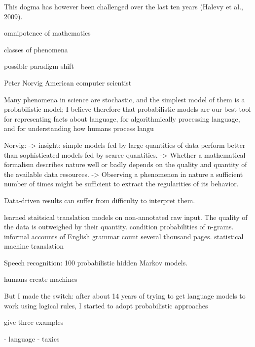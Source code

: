 \documentclass[authoryear,review,3p]{elsarticle}
\begin{document}
This dogma has however been challenged over the last ten years
(Halevy et al., 2009).

omnipotence of mathematics



classes of phenomena

possible paradigm shift

Peter Norvig 
American computer scientist


Many phenomena in science are stochastic, and the simplest model of them is a probabilistic model; I believe therefore that probabilistic models are our best tool for representing facts about language, for algorithmically processing language, and for understanding how humans process langu


Norvig:
-> insight: simple models fed by large quantities of data perform
better than sophisticated models fed by scarce quantities.
-> Whether a mathematical formalism describes nature well or badly
depends on the quality and quantity of the available data resources.
-> Observing a phenomenon in nature a sufficient number of times
might be sufficient to extract the regularities of its behavior.

Data-driven results can suffer from difficulty to interpret them.

learned staitsical translation models on non-annotated raw
input.
The quality of the data is outweighed by their quantity.
condition probabilities of n-grams.
informal accounts of English grammar count several thousand pages.
statistical machine translation

Speech recognition: 100%
probabilistic hidden Markov models.



humans create machines

But I made the switch: after about 14 years of trying to get language models to work using logical rules, I started to adopt probabilistic approaches


give three examples

- language
- taxics
\end{document}
